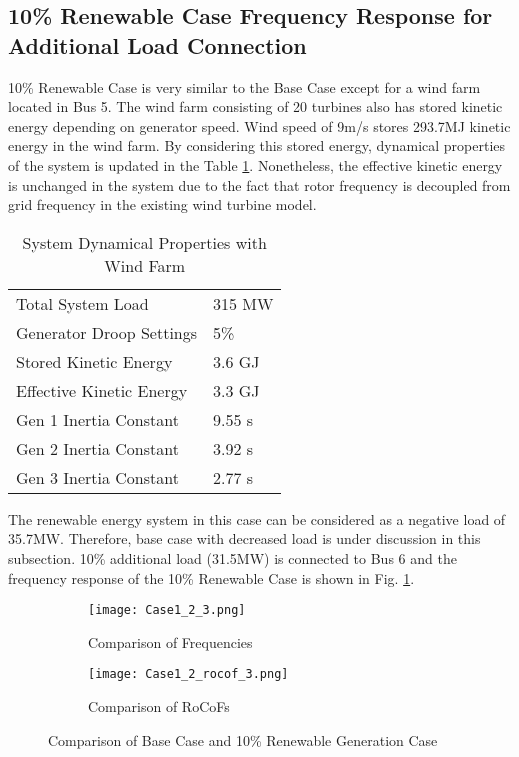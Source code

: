 \subsection{10\% Renewable Case Frequency Response for Additional Load Connection}
10\% Renewable Case is very similar to the Base Case except for a wind farm located in Bus 5. The wind farm consisting of 20 turbines also has stored kinetic energy depending on generator speed. Wind speed of 9m/s stores 293.7MJ kinetic energy in the wind farm. By considering this stored energy, dynamical properties of the system is updated in the Table \ref{systemdynamicaldatamod}. Nonetheless, the effective kinetic energy is unchanged in the system due to the fact that rotor frequency is decoupled from grid frequency in the existing wind turbine model.\par
\begin{table}[h]
	\centering
	\begin{tabular}{ll}
		\hline
		Total System Load                      & 315 MW    \\
		Generator Droop Settings               & 5\%       \\
		Stored Kinetic Energy                  & 3.6 GJ \\
		Effective Kinetic Energy               & 3.3 GJ \\
		Gen 1 Inertia Constant                 & 9.55 s  \\
		Gen 2 Inertia Constant                 & 3.92 s  \\
		Gen 3 Inertia Constant                 & 2.77 s  \\ \hline
	\end{tabular}
	\caption{System Dynamical Properties with Wind Farm}
	\label{systemdynamicaldatamod}
\end{table}
\newpage
The renewable energy system in this case can be considered as a negative load of 35.7MW. Therefore, base case with decreased load is under discussion in this subsection. 10\% additional load (31.5MW) is connected to Bus 6 and the frequency response of the 10\% Renewable Case is shown in Fig. \ref{Case1_2_freq}. \par
\begin{figure}[h]
	\centering
		\begin{subfigure}{0.85\textwidth} %
			\centering
		\texttt{[image: Case1\_2\_3.png]}
		\caption{Comparison of Frequencies}		
		\label{Case1_2_freq}
		\end{subfigure}
		\vspace{0.1em} %
	\begin{subfigure}{0.85\textwidth}
\centering	\texttt{[image: Case1\_2\_rocof\_3.png]}
	\caption{Comparison of RoCoFs}
	\label{Case1_2_rocof}	
	\end{subfigure}
	\caption{Comparison of Base Case and 10\% Renewable Generation Case}
\end{figure}
